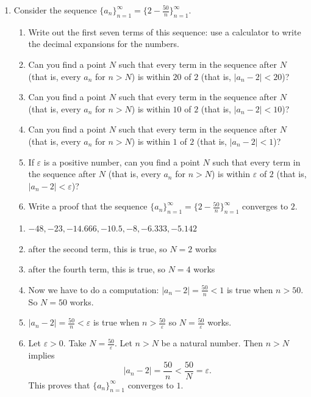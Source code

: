 \documentclass[12pt]{amsart}
\numberwithin{equation}{section}
\theoremstyle{plain} %
\theoremstyle{definition}
\theoremstyle{remark}
\begin{document}
\begin{enumerate}
\item Consider the sequence $\{a_n\}_{n=1}^\infty = \{2- \frac{50}{n}\}_{n=1}^{\infty}$.
\begin{enumerate}
\item Write out the first seven terms of this sequence: use a calculator to write the decimal expansions for the numbers.
\item Can you find a point $N$ such that every term in the sequence after $N$ (that is, every $a_n$ for $n>N$) is within $20$ of $2$ (that is, $|a_n-2|<20$)?
\item Can you find a point $N$ such that every term in the sequence after $N$ (that is, every $a_n$ for $n>N$) is within $10$ of $2$ (that is, $|a_n-2|<10$)?
\item Can you find a point $N$ such that every term in the sequence after $N$  (that is, every $a_n$ for $n>N$) is within $1$ of $2$ (that is, $|a_n-2|<1$)?
\item If $\varepsilon$ is a positive number, can you find a point $N$ such that every term in the sequence after $N$  (that is, every $a_n$ for $n>N$) is within $\varepsilon$ of $2$ (that is, $|a_n-2|<\varepsilon$)?
\item Write a proof that the sequence  $\{a_n\}_{n=1}^\infty = \{2- \frac{50}{n}\}_{n=1}^{\infty}$ converges to $2$.
\end{enumerate}

\begin{framed}
\begin{enumerate}
\item $-48,-23,-14.666,-10.5, -8, -6.333, -5.142$
\item after the second term, this is true, so $N=2$ works
\item after the fourth term, this is true, so $N=4$ works
\item Now we have to do a computation: $|a_n-2| = \frac{50}{n} < 1$ is true when $n>50$. So $N=50$ works.
\item $|a_n-2| =  \frac{50}{n} < \varepsilon$ is true when $n> \frac{50}{\varepsilon}$ so $N=\frac{50}{\varepsilon}$ works.
\item Let $\varepsilon>0$. Take $N=\frac{50}{\varepsilon}$. Let $n>N$ be a natural number. Then $n>N$ implies 
\[ |a_n - 2| = \frac{50}{n} < \frac{50}{N} = \varepsilon.\]
This proves that $\{a_n\}_{n=1}^\infty$ converges to $1$.
\end{enumerate}
\end{framed}


\end{enumerate}
\end{document}
